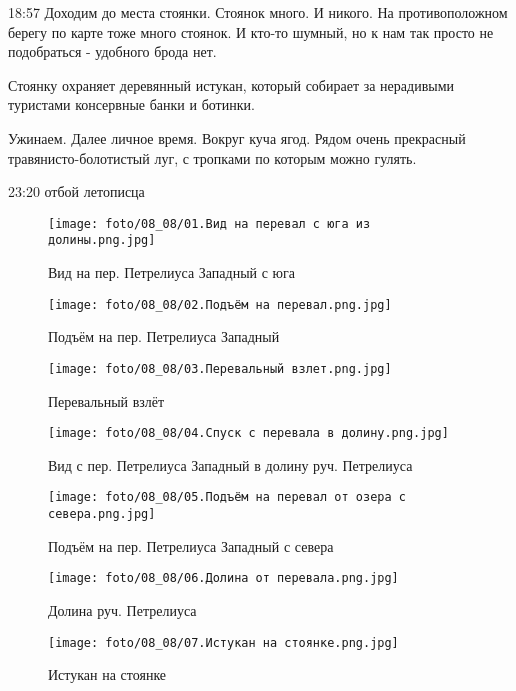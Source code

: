 18:57 Доходим до места стоянки. Стоянок много. И никого.
На противоположном берегу по карте тоже много стоянок. И кто-то шумный, но к нам так просто не подобраться - удобного брода нет.

Стоянку охраняет деревянный истукан, который собирает за нерадивыми туристами консервные банки и ботинки.

Ужинаем. Далее личное время.
Вокруг куча ягод. Рядом очень прекрасный травянисто-болотистый луг, с тропками по которым можно гулять.

23:20 отбой летописца

\begin{figure}
    \centering
    \texttt{[image: foto/08\_08/01.Вид на перевал с юга из долины.png.jpg]}
    \caption{Вид на пер. Петрелиуса Западный с юга}
\end{figure}

\begin{figure}
    \centering
    \texttt{[image: foto/08\_08/02.Подъём на перевал.png.jpg]}
    \caption{Подъём на пер. Петрелиуса Западный}
\end{figure}

\begin{figure}
    \centering
    \texttt{[image: foto/08\_08/03.Перевальный взлет.png.jpg]}
    \caption{Перевальный взлёт}
\end{figure}

\begin{figure}
    \centering
    \texttt{[image: foto/08\_08/04.Спуск с перевала в долину.png.jpg]}
    \caption{Вид с пер. Петрелиуса Западный в долину руч. Петрелиуса}
\end{figure}

\begin{figure}
    \centering
    \texttt{[image: foto/08\_08/05.Подъём на перевал от озера с севера.png.jpg]}
    \caption{Подъём на пер. Петрелиуса Западный с севера}
\end{figure}

\begin{figure}
    \centering
    \texttt{[image: foto/08\_08/06.Долина от перевала.png.jpg]}
    \caption{Долина руч. Петрелиуса}
\end{figure}

\begin{figure}[H]
    \centering
    \texttt{[image: foto/08\_08/07.Истукан на стоянке.png.jpg]}
    \caption{Истукан на стоянке}
\end{figure}


